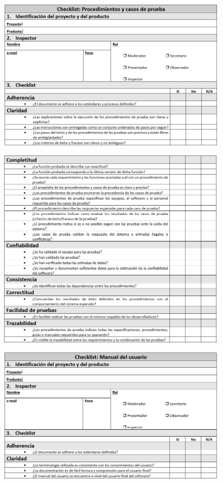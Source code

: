 \begin{figure}[H]
\centering
\includegraphics[width=1\textwidth]{figures/anexos/3-2-6a.PNG}
\end{figure}

\begin{figure}[H]
\centering
\includegraphics[width=1\textwidth]{figures/anexos/3-2-6b.PNG}
\end{figure}

\begin{figure}[H]
\centering
\includegraphics[width=1\textwidth]{figures/anexos/3-2-7a.PNG}
\end{figure}

